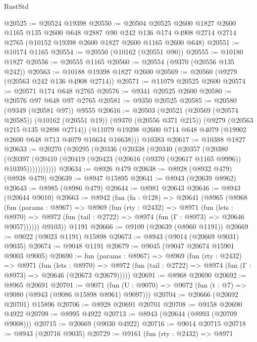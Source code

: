 \begin{lexlean}{RustStd}
\begin{coremodule}
{\begin{coremodule}
{{{{{{{{{{{{{{{{{{{{{{{{{{{{{{{{{{{{{{{@20525 := @20524 @19398
@20550 := @20504
    @20525
    @2600
    @1827
    @2600
    @1165
    @135
    @2600
    @648
    @2887
    @90
    @242
    @136
    @174
    @4908
    @2714
    @2714
    @2765
    (@10152 @19398 @2600 @1827 @2600 @1165 @2600 @648)
@20551 := @10174 @1165
@20554 := @20550 (@10162 (@20551 @90))
@20555 := @10180 @1827
@20556 := @20555 @1165
@20560 := @20554 (@9370 (@20556 @135 @242))
@20563 := @10188 @19398 @1827 @2600
@20569 := @20560 (@9279 (@20563 @242 @136 @4908 @2714))
@20571 := @11079 @20525 @2600
@20574 := @20571 @174 @648 @2765
@20576 := @9341 @20525 @2600
@20580 := @20576 @97 @648 @97 @2765
@20581 := @9350 @20525
@20585 := @20580 (@9349 (@20581 @97)) @9555
@20616 := @20503
    (@20521
      (@20569 (@20574 @20585))
      (@10162 (@20551 @19))
      (@9370 (@20556 @371 @215))
      (@9279 (@20563 @215 @135 @2898 @2714))
      (@11079 @19398 @2600 @714 @648 @4079 (@19902 @2600 @648 @713 @4079 @16634 @16638)))
    @10383
@20617 := @10388 @1827
@20633 := @20270
    (@20295
      (@20336
        (@20338
          (@20340
            (@20357
              (@20380
                (@20397
                  (@20410 (@20419 (@20423 (@20616 (@9370 (@20617 @1165 @9996)) @10395)))))))))))
@20634 := @8926 @479
@20638 := @8928 (@8932 @479) (@8938 @479)
@20639 := @8947 @15895
@20641 := @8943 (@20639 @8962)
@20643 := @8985 (@8986 @479)
@20644 := @8981 @20643
@20646 := @8943 (@20644 @9010)
@20663 := @8942
    (fun (fn : @128) =>
    @20641
      (@8965
        (@8968
          (fun (params : @8967) =>
          @8969
            (fun (rty : @2432) =>
            @8971
              (fun (lets : @8970) =>
              @8972 (fun (tail : @2722) => @8974 (fun (Γ : @8973) => @20646 @9057))))))
        @9103))
    @1191
@20666 := @9109 (@20639 (@8960 @1191))
@20669 := @9022 (@9023 @1191) @15898
@20673 := @8943 (@9014 (@20669 @9031) @9035)
@20674 := @9048 @1191
@20679 := @9045 (@9047 @20674 @15901 @9003 @9005)
@20690 := fun (params : @8967) =>
  @8969
    (fun (rty : @2432) =>
    @8971
      (fun (lets : @8970) =>
      @8972 (fun (tail : @2722) => @8974 (fun (Γ : @8973) => @20646 (@20673 @20679)))))
@20691 := @8968 @20690
@20692 := @8965 @20691
@20701 := @9071
    (fun (U : @9070) => @9072 (fun (t : @7) => @9080 (@8943 (@9086 @15898 @8961) @9097)))
@20704 := @20666 (@20692 @20701) @15896
@20706 := @8928 @20691 @20701
@20708 := @9158 @20690 @4922
@20709 := @8995 @4922
@20713 := @8943 (@20644 (@8993 (@20709 @9008)))
@20715 := @20669 (@9030 @4922)
@20716 := @9014 @20715
@20718 := @8943 (@20716 @9035)
@20729 := @9161
    (fun (rty : @2432) =>
    @8971
}}}}}}}}}}}}}}}}}}}}}}}}}}}}}}}}}}}}}}}
\end{coremodule}}
\end{coremodule}
\end{lexlean}
